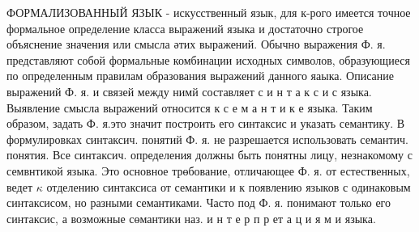 \documentclass[10pt]{article}
\begin{document}
ФОРМАЛИЗОВАННЫЙ ЯЗЫК - искусственный язык, для к-рого имеется точное формальное определение класса выражений языка и достаточно строгое объяснение значения или смысла әтих выражений. Обычно выражения Ф. я. представляют собой формальные комбинации исходных символов, образующиеся по определенным правилам образования выражений данного яаыка. Описание выражений Ф. я. и связей между нимй составляет с и н т а к с и с языка. Выявление смысла выражений относится к с е м а н т и к е языка. Таким образом, задать Ф. я.это значит построить его синтаксис и указать семантику. В формулировках синтаксич. понятий Ф. я. не разрешается использовать семантич. понятия. Все синтаксич. определения должны быть понятны лицу, незнакомому с семвнтикой языка. Это основное трөбование, отличающее Ф. я. от естественных, ведет $\kappa$ отделению синтаксиса от семантики и к появлению языков с одинаковым синтаксисом, но разными семантиками. Часто под Ф. я. понимают только его синтаксис, а возможные сөмантики наз. и н т е р п р ет а ц и я м и языка.
\end{document}
